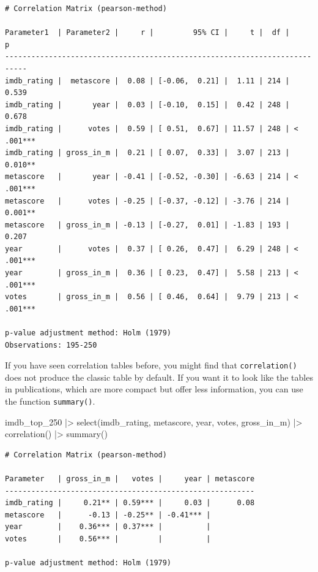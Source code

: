 \documentclass[
  letterpaper,
]{krantz}
\makeatletter
\newenvironment{Shaded}{\begin{snugshade}}{\end{snugshade}}
\newcommand{\FunctionTok}[1]{\textcolor[rgb]{0.28,0.35,0.67}{#1}}
\newcommand{\NormalTok}[1]{\textcolor[rgb]{0.00,0.23,0.31}{#1}}
\newcommand{\SpecialCharTok}[1]{\textcolor[rgb]{0.37,0.37,0.37}{#1}}
\newenvironment{kframe}{%
\medskip{}
\setlength{\fboxsep}{.8em}
 \def\at@end@of@kframe{}%
 \ifinner\ifhmode%
  \def\at@end@of@kframe{\end{minipage}}%
  \begin{minipage}{\columnwidth}%
 \fi\fi%
 \def\FrameCommand##1{\hskip\@totalleftmargin \hskip-\fboxsep
 \colorbox{shadecolor}{##1}\hskip-\fboxsep
     \hskip-\linewidth \hskip-\@totalleftmargin \hskip\columnwidth}%
 \MakeFramed {\advance\hsize-\width
   \@totalleftmargin\z@ \linewidth\hsize
   \@setminipage}}%
 {\par\unskip\endMakeFramed%
 \at@end@of@kframe}
\renewenvironment{Shaded}{\begin{kframe}}{\end{kframe}}
\makeatother
\begin{document}
\begin{verbatim}
# Correlation Matrix (pearson-method)

Parameter1  | Parameter2 |     r |         95% CI |     t |  df |         p
---------------------------------------------------------------------------
imdb_rating |  metascore |  0.08 | [-0.06,  0.21] |  1.11 | 214 | 0.539    
imdb_rating |       year |  0.03 | [-0.10,  0.15] |  0.42 | 248 | 0.678    
imdb_rating |      votes |  0.59 | [ 0.51,  0.67] | 11.57 | 248 | < .001***
imdb_rating | gross_in_m |  0.21 | [ 0.07,  0.33] |  3.07 | 213 | 0.010**  
metascore   |       year | -0.41 | [-0.52, -0.30] | -6.63 | 214 | < .001***
metascore   |      votes | -0.25 | [-0.37, -0.12] | -3.76 | 214 | 0.001**  
metascore   | gross_in_m | -0.13 | [-0.27,  0.01] | -1.83 | 193 | 0.207    
year        |      votes |  0.37 | [ 0.26,  0.47] |  6.29 | 248 | < .001***
year        | gross_in_m |  0.36 | [ 0.23,  0.47] |  5.58 | 213 | < .001***
votes       | gross_in_m |  0.56 | [ 0.46,  0.64] |  9.79 | 213 | < .001***

p-value adjustment method: Holm (1979)
Observations: 195-250
\end{verbatim}

If you have seen correlation tables before, you might find that
\texttt{correlation()} does not produce the classic table by default. If
you want it to look like the tables in publications, which are more
compact but offer less information, you can use the function
\texttt{summary()}.

\begin{Shaded}
\begin{Highlighting}[]
\NormalTok{imdb\_top\_250 }\SpecialCharTok{|\textgreater{}}
  \FunctionTok{select}\NormalTok{(imdb\_rating, metascore, year, votes, gross\_in\_m) }\SpecialCharTok{|\textgreater{}}
  \FunctionTok{correlation}\NormalTok{() }\SpecialCharTok{|\textgreater{}}
  \FunctionTok{summary}\NormalTok{()}
\end{Highlighting}
\end{Shaded}

\begin{verbatim}
# Correlation Matrix (pearson-method)

Parameter   | gross_in_m |   votes |     year | metascore
---------------------------------------------------------
imdb_rating |     0.21** | 0.59*** |     0.03 |      0.08
metascore   |      -0.13 | -0.25** | -0.41*** |          
year        |    0.36*** | 0.37*** |          |          
votes       |    0.56*** |         |          |          

p-value adjustment method: Holm (1979)
\end{verbatim}
\end{document}
